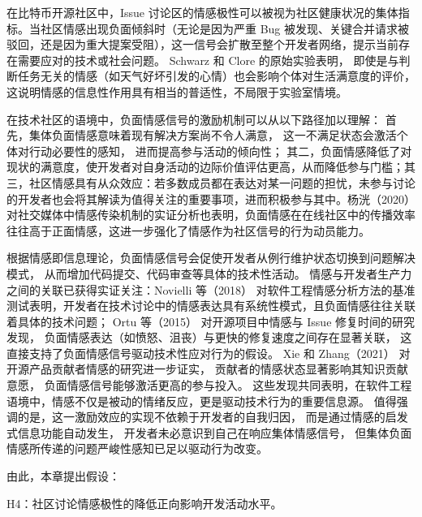 \documentclass[
    type = master, %
    degree = professional,        %
    decl-page,  %
    twoside,                %
    fontset = fandol %
  ]{njuthesis}
\begin{document}
在比特币开源社区中，Issue 讨论区的情感极性可以被视为社区健康状况的集体指标。当社区情感出现负面倾斜时（无论是因为严重 Bug 被发现、关键合并请求被驳回，还是因为重大提案受阻），这一信号会扩散至整个开发者网络，提示当前存在需要应对的技术或社会问题。
Schwarz 和 Clore \citeyear{schwarz1983moods}的原始实验表明，
即使是与判断任务无关的情感（如天气好坏引发的心情）也会影响个体对生活满意度的评价，
这说明情感的信息性作用具有相当的普适性，不局限于实验室情境。

在技术社区的语境中，负面情感信号的激励机制可以从以下路径加以理解：
首先，集体负面情感意味着现有解决方案尚不令人满意，
这一不满足状态会激活个体对行动必要性的感知，
进而提高参与活动的倾向性；
其二，负面情感降低了对现状的满意度，使开发者对自身活动的边际价值评估更高，从而降低参与门槛；其三，社区情感具有从众效应：若多数成员都在表达对某一问题的担忧，未参与讨论的开发者也会将其解读为值得关注的重要事项，进而积极参与其中\cite{yang2021differential}。杨{\notoserifjk 洸}（2020）\cite{yang2020sentiment}对社交媒体中情感传染机制的实证分析也表明，负面情感在在线社区中的传播效率往往高于正面情感，这进一步强化了情感作为社区信号的行为动员能力。

根据情感即信息理论，负面情感信号会促使开发者从例行维护状态切换到问题解决模式，
从而增加代码提交、代码审查等具体的技术性活动。
情感与开发者生产力之间的关联已获得实证关注：Novielli 等（2018）\cite{novielli2018sentiment} 对软件工程情感分析方法的基准测试表明，开发者在技术讨论中的情感表达具有系统性模式，且负面情感往往关联着具体的技术问题；
Ortu 等（2015）\cite{ortu2015bullies} 对开源项目中情感与 Issue 修复时间的研究发现，
负面情感表达（如愤怒、沮丧）与更快的修复速度之间存在显著关联，
这直接支持了负面情感信号驱动技术性应对行为的假设。
Xie 和 Zhang（2021）\cite{xie2021influence} 对开源产品贡献者情感的研究进一步证实，
贡献者的情感状态显著影响其知识贡献意愿，
负面情感信号能够激活更高的参与投入。
这些发现共同表明，在软件工程语境中，情感不仅是被动的情绪反应，更是驱动技术行为的重要信息源。
值得强调的是，这一激励效应的实现不依赖于开发者的自我归因，
而是通过情感的启发式信息功能自动发生，
开发者未必意识到自己在响应集体情感信号，
但集体负面情感所传递的问题严峻性感知已足以驱动行为改变。

由此，本章提出假设：

H4：社区讨论情感极性的降低正向影响开发活动水平。
\end{document}

